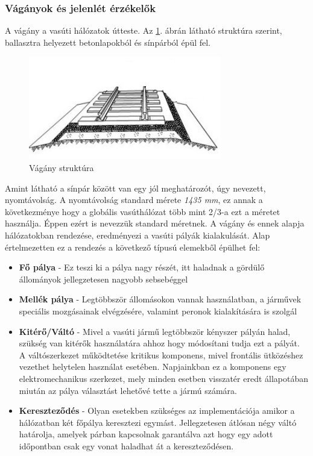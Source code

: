 \documentclass[a4paper,12pt]{article}
\begin{document}
\subsubsection{Vágányok és jelenlét érzékelők}
A vágány a vasúti hálózatok útteste. Az \ref{fig:rail_track}. ábrán látható struktúra szerint, ballasztra helyezett betonlapokból és sínpárból épül fel.

\begin{figure}
	\vspace{-20pt}
	\centering
	\includegraphics[scale=0.5]{images/rail_track.png}
	\caption[Vágány struktúra]{Vágány struktúra}
	\label{fig:rail_track}
\end{figure}

Amint látható a sínpár között van egy jól meghatározót, úgy nevezett, nyomtávolság.
A nyomtávolság standard mérete \textit{1435 mm}, ez annak a következménye hogy a globális vasúthálózat több mint 2/3-a ezt a méretet használja.
Éppen ezért is nevezzük standard méretnek. A vágány és ennek alapja hálózatokban rendezése, eredményezi a vasúti pályák kialakulását.
Alap értelmezetten ez a rendezés a következő típusú elemekből épülhet fel:
\begin{itemize}
	\item \textbf{Fő pálya} - Ez teszi ki a pálya nagy részét, itt haladnak a gördülő állományok jellegzetesen nagyobb sebsebéggel
	\item \textbf{Mellék pálya} - Legtöbbször állomásokon vannak használatban, a járművek speciális mozgásainak elvégzésére, valamint peronok kialakítására is szolgál
	\item \textbf{Kitérő/Váltó} - Mivel a vasúti jármű legtöbbször kényszer pályán halad, szükség van kitérők használatára ahhoz hogy módosítani tudja ezt a pályát.
	A váltószerkezet működtetése kritikus komponens, mivel frontális ütközéshez vezethet helytelen használat esetében. 
	Napjainkban ez a komponens egy elektromechanikus szerkezet, mely minden esetben visszatér eredt állapotában miután az pálya választást lehetővé tette a jármú számára.
	\item \textbf{Kereszteződés} - Olyan esetekben szükséges az implementációja amikor a hálózatban két főpálya keresztezi egymást.
	Jellegzetesen átlósan négy váltó határolja, amelyek párban kapcsolnak garantálva azt hogy egy adott időpontban csak egy vonat haladhat át a kereszteződésen.
\end{itemize}
\end{document}
